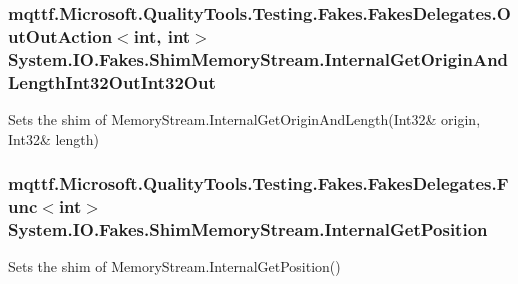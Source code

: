 \hypertarget{class_system_1_1_i_o_1_1_fakes_1_1_shim_memory_stream_ab30b1c32b7a778bdb24137ddf2e04c20}{
\subsubsection[{Internal\-Get\-Origin\-And\-Length\-Int32\-Out\-Int32\-Out}]{\setlength{\rightskip}{0pt plus 5cm}mqttf.\-Microsoft.\-Quality\-Tools.\-Testing.\-Fakes.\-Fakes\-Delegates.\-Out\-Out\-Action$<$int, int$>$ System.\-I\-O.\-Fakes.\-Shim\-Memory\-Stream.\-Internal\-Get\-Origin\-And\-Length\-Int32\-Out\-Int32\-Out\hspace{0.3cm}{\ttfamily [set]}}}\label{class_system_1_1_i_o_1_1_fakes_1_1_shim_memory_stream_ab30b1c32b7a778bdb24137ddf2e04c20}


Sets the shim of Memory\-Stream.\-Internal\-Get\-Origin\-And\-Length(Int32\& origin, Int32\& length)

\hypertarget{class_system_1_1_i_o_1_1_fakes_1_1_shim_memory_stream_aea602313fdbbea76928ef0d283b430ec}{
\subsubsection[{Internal\-Get\-Position}]{\setlength{\rightskip}{0pt plus 5cm}mqttf.\-Microsoft.\-Quality\-Tools.\-Testing.\-Fakes.\-Fakes\-Delegates.\-Func$<$int$>$ System.\-I\-O.\-Fakes.\-Shim\-Memory\-Stream.\-Internal\-Get\-Position\hspace{0.3cm}{\ttfamily [set]}}}\label{class_system_1_1_i_o_1_1_fakes_1_1_shim_memory_stream_aea602313fdbbea76928ef0d283b430ec}


Sets the shim of Memory\-Stream.\-Internal\-Get\-Position()

